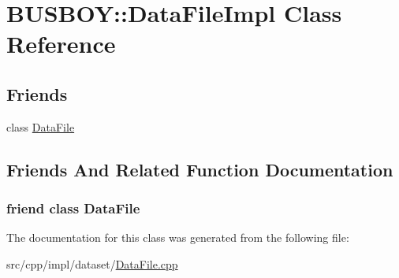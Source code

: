 \hypertarget{classBUSBOY_1_1DataFileImpl}{
\section{BUSBOY::DataFileImpl Class Reference}
\label{classBUSBOY_1_1DataFileImpl}
}
\subsection*{Friends}
\begin{DoxyCompactItemize}
\item 
class \hyperlink{classBUSBOY_1_1DataFileImpl_a5a6cedcfb00dea2bb9a5708d69360473}{DataFile}
\end{DoxyCompactItemize}


\subsection{Friends And Related Function Documentation}
\hypertarget{classBUSBOY_1_1DataFileImpl_a5a6cedcfb00dea2bb9a5708d69360473}{
\subsubsection[{DataFile}]{\setlength{\rightskip}{0pt plus 5cm}friend class {\bf DataFile}}}
\label{classBUSBOY_1_1DataFileImpl_a5a6cedcfb00dea2bb9a5708d69360473}


The documentation for this class was generated from the following file:\begin{DoxyCompactItemize}
\item 
src/cpp/impl/dataset/\hyperlink{DataFile_8cpp}{DataFile.cpp}\end{DoxyCompactItemize}
